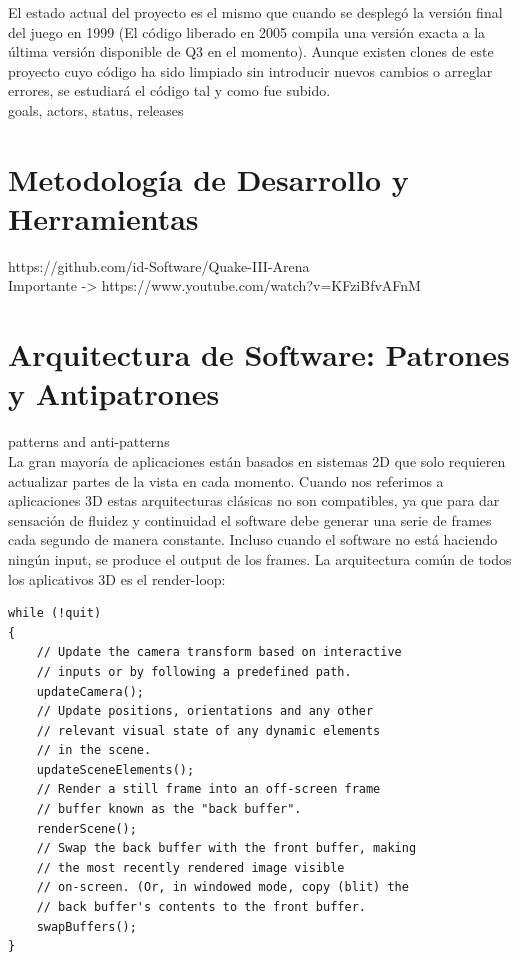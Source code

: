 \documentclass[a4paper,12pt]{report}
\begin{document}
	El estado actual del proyecto es el mismo que cuando se desplegó la versión final del juego en 1999 (El código liberado en 2005 compila una versión exacta a la última versión disponible de Q3 en el momento). Aunque existen clones de este proyecto cuyo código ha sido limpiado sin introducir nuevos cambios o arreglar errores, se estudiará el código tal y como fue subido.\\
	
	goals, actors, status, releases \cite{example}\\
	
	\section{Metodología de Desarrollo y Herramientas}
	https://github.com/id-Software/Quake-III-Arena\\
	Importante -> https://www.youtube.com/watch?v=KFziBfvAFnM\\
	
	\section{Arquitectura de Software: Patrones y Antipatrones}
	patterns and anti-patterns\\
	La gran mayoría de aplicaciones están basados en sistemas 2D que solo requieren actualizar partes de la vista en cada momento. Cuando nos referimos a aplicaciones 3D estas arquitecturas clásicas no son compatibles, ya que para dar sensación de fluidez y continuidad el software debe generar una serie de frames cada segundo de manera constante. Incluso cuando el software no está haciendo ningún input, se produce el output de los frames. La arquitectura común de todos los aplicativos 3D es el render-loop:
	

	
	\begin{lstlisting}[style=C, numbers=none]
while (!quit)
{
	// Update the camera transform based on interactive
	// inputs or by following a predefined path.
	updateCamera();
	// Update positions, orientations and any other
	// relevant visual state of any dynamic elements
	// in the scene.
	updateSceneElements();
	// Render a still frame into an off-screen frame
	// buffer known as the "back buffer".
	renderScene();
	// Swap the back buffer with the front buffer, making
	// the most recently rendered image visible
	// on-screen. (Or, in windowed mode, copy (blit) the
	// back buffer's contents to the front buffer.
	swapBuffers();
}
\end{lstlisting}
	
\end{document}
